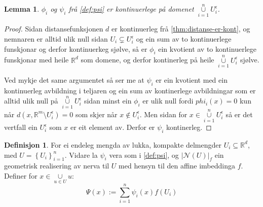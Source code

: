 \documentclass[a4paper, titlepage, 12pt, norsk]{article}
\theoremstyle{plain}
\newtheorem{lemma}[theorem]{Lemma}
\theoremstyle{definition}
\newtheorem{definition}[theorem]{Definisjon}
\newcommand{\Rb}{\mathbb{R}}
\newcommand{\Nc}{\mathcal{N}}
\newcommand{\union}{ \mathop{\cup}\limits }
\newcommand{\gr}[1]{ \lvert #1 \rvert } %
\newcommand{\set}[1]{ \left \{ #1 \right \} } %
\begin{document}
\begin{lemma}
	\( \phi_i \) og \( \psi_i \) frå \autoref{def:psi} er kontinuerlege på domenet \( \union_{i=1}^n U_i^\epsilon \).
\end{lemma}

\begin{proof} 
	Sidan distansefunksjonen \( d \) er kontinuerleg frå \autoref{thm:distanse-er-kont}, og nemnaren er alltid ulik null sidan \( U_i \subsetneq U_i^\epsilon \) og ein sum av to kontinuerlege funskjonar og derfor kontinuerkeg sjølve, så er \( \phi_i \) ein kvotient av to kontinuerlege funskjonar med heile \( \Rb^d \) som domene, og derfor kontinerleg på heile \( \union_{i=1}^n U_i^\epsilon \) sjølve.

	Ved mykje det same argumentet så ser me at \( \psi_i \) er ein kvotient med ein kontinuerleg avbildning i teljaren og ein sum av kontinerlege avbildningar som er alltid ulik null på \( \union_{i=1}^n U_i^\epsilon \) sidan minst ein \( \phi_i \) er ulik null fordi \( phi_i(x)=0 \) kun når \( d(x, \Rb^m \setminus U_i^\epsilon)=0 \) som skjer når \( x \not\in U_i^\epsilon \). Men sidan for \( x \in \union_{i=1}^n U_i^\epsilon \) så er det vertfall ein \( U_i^\epsilon \) som \( x \) er eit element av. Derfor er \( \psi_i \) kontinerleg.
\end{proof}



\begin{definition} \label{def:Psi}
	For ei endeleg mengda av lukka, kompakte delmengder \( U_i \subseteq \Rb^d \), med \( U = \set{U_i}_{i=1}^n \). Vidare la \( \psi_i \) vera som i \autoref{def:psi}, og \( \gr{\Nc(U)}_f \) ein geometrisk realisering av nerva til \( U \) med hensyn til den affine imbeddinga \( f \). Definer for \( x \in \union_{u \in U} u \):
	\[
		\Psi(x) := \sum_{i=1}^n \psi_i(x)f(U_i)
	\]
\end{definition}
\end{document}
